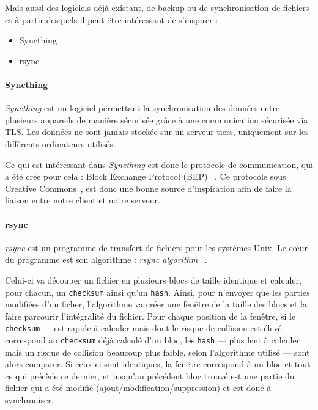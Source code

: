 \documentclass[a4paper,10pt, twoside]{report}
\begin{document}
\begin{spacing}{1.2}
Mais aussi des logiciels d\'ej\`a existant, de backup ou de synchronisation de
fichiers et \`a partir desquels il peut \^etre int\'eressant de s'inspirer :
\begin{itemize}
 \item Syncthing~\cite{refSyncthing}
 \item rsync~\cite{refRsync}
\end{itemize}

\paragraph{Syncthing\\}
\textit{Syncthing} est un logiciel permettant la synchronisation des donn\'ees
entre plusieurs appareils de mani\`ere s\'ecuris\'ee gr\^ace \`a une
communication s\'ecuris\'ee via TLS. Les donn\'ees ne sont jamais stock\'ee
sur un serveur tiers, uniquement sur les diff\'erents ordinateurs utilis\'es.

Ce qui est int\'eressant dans \textit{Syncthing} est donc le protocole de
communication, qui a \'et\'e cr\'ee pour cela : Block Exchange Protocol (BEP)
~\cite{refBEP}. Ce protocole sous Creative Commons~\cite{refCC4.0}, est donc
une bonne source d'inspiration afin de faire la liaison entre notre client et
notre serveur.

\paragraph{rsync\\}
\textit{rsync} est un programme de transfert de fichiers pour les syst\`emes
Unix. Le c\oe ur du programme est son algorithme :
\textit{\flqq rsync algorithm \frqq}~\cite{refRsyncAlgo}.

Celui-ci va d\'ecouper un fichier en plusieurs blocs de taille identique et
calculer, pour chacun, un \texttt{checksum} ainsi qu'un \texttt{hash}. Ainsi,
pour n'envoyer que les parties modifi\'ees d'un ficher, l'algorithme va cr\'eer
une fen\^etre de la taille des blocs et la faire parcourir l'int\'egralit\'e du
fichier. Pour chaque position de la fen\^etre, si le \texttt{checksum} --- est
rapide \`a calculer mais dont le risque de collision est \'elev\'e ---
correspond au \texttt{checksum} d\'ej\`a calcul\'e d'un bloc, les \texttt{hash}
--- plus lent \`a calculer mais un risque de collision beaucoup plus faible, 
selon l'algorithme utilis\'e --- sont alors comparer. Si ceux-ci sont
identiques, la fen\^etre correspond \`a un bloc et tout ce qui pr\'ec\`ede ce
dernier, et jusqu'au pr\'ec\'edent bloc trouv\'e est une partie du fichier qui
a \'et\'e modifi\'e (ajout/modification/suppression) et est donc \`a
synchroniser.


\end{spacing}
\end{document}
